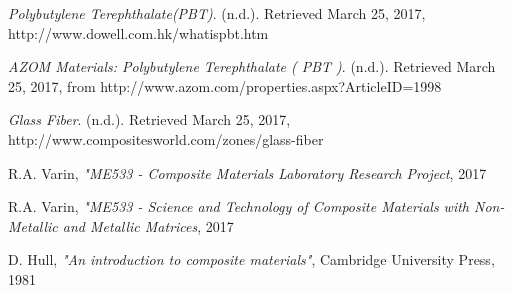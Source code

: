 \documentclass[11pt]{article}
\begin{document}
\newpage
\begin{thebibliography}{9}

\textit{Polybutylene Terephthalate(PBT)}. (n.d.). Retrieved March 25, 2017, http://www.dowell.com.hk/whatispbt.htm

\textit{AZOM Materials: Polybutylene Terephthalate ( PBT )}. (n.d.). Retrieved March 25, 2017, from http://www.azom.com/properties.aspx?ArticleID=1998

\textit{Glass Fiber}. (n.d.). Retrieved March 25, 2017, http://www.compositesworld.com/zones/glass-fiber

R.A. Varin, \textit{"ME533 - Composite Materials Laboratory Research Project}, 2017

R.A. Varin, \textit{"ME533 - Science and Technology of Composite Materials with Non-Metallic and Metallic Matrices}, 2017

D. Hull, \textit{"An introduction to composite materials"}, Cambridge University Press, 1981

\end{thebibliography}
\end{document}
